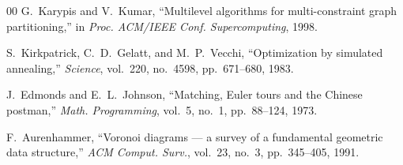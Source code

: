 \documentclass[conference]{IEEEtran}
\begin{document}
\begin{thebibliography}{00}
G.~Karypis and V.~Kumar, ``Multilevel algorithms for multi-constraint graph partitioning,'' in \emph{Proc. ACM/IEEE Conf. Supercomputing}, 1998.

S.~Kirkpatrick, C.~D.~Gelatt, and M.~P.~Vecchi, ``Optimization by simulated annealing,'' \emph{Science}, vol.~220, no.~4598, pp.~671--680, 1983.

J.~Edmonds and E.~L.~Johnson, ``Matching, Euler tours and the Chinese postman,'' \emph{Math. Programming}, vol.~5, no.~1, pp.~88--124, 1973.

F.~Aurenhammer, ``Voronoi diagrams --- a survey of a fundamental geometric data structure,'' \emph{ACM Comput. Surv.}, vol.~23, no.~3, pp.~345--405, 1991.

\end{thebibliography}
\end{document}
